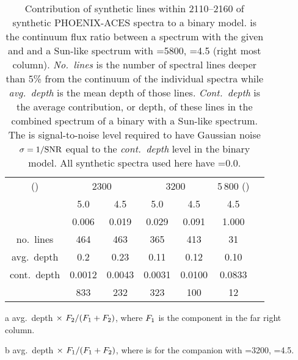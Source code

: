 
\begin{table}
    \small
    \centering
    \begin{threeparttable}[b]
        \caption[Analysis of spectral line depths.]{Contribution of synthetic lines within 2110--2160\nm{} of synthetic {PHOENIX-ACES} spectra to a binary model.
            \FtwoFone{} is the continuum flux ratio between a spectrum with the given \Teff{} and \Logg{} and a Sun-like spectrum with \Teff{}=5800, \Logg{}=4.5 (right most column).
            \emph{No.~lines} is the number of spectral lines deeper than 5\% from the continuum of the individual spectra while \emph{avg.~depth} is the mean depth of those lines.
            \emph{Cont.~depth} is the average contribution, or depth, of these lines in the combined spectrum of a binary with a Sun-like spectrum.
            The \snr{} is signal-to-noise level required to have Gaussian noise \(\sigma=1/\textrm{SNR}{}\) equal to the \emph{cont.~depth} level in the binary model.
            All synthetic spectra used here have \feh{}=0.0.}
        \begin{tabular}{*7c}
            \toprule
            \Teff{} (\K{}) & \multicolumn{2}{c}{2300} & \multicolumn{2}{c}{3200} & 5\,800 (\Fone{})\\
           \Logg{} & 5.0 & 4.5 & 5.0 & 4.5 & 4.5 \\
            \midrule
            \FtwoFone{} & 0.006 & 0.019 & 0.029 & 0.091 & 1.000 \\
            no.~lines & 464 & 463 & 365 & 413 & 31 \\
            avg.~depth & 0.2 & 0.23 & 0.11 & 0.12 & 0.10 \\
            cont.~depth\tnote{a} &  0.0012 & 0.0043 &  0.0031 & 0.0100 & 0.0833\tnote{b} \\
            \snr{} & 833 & 232 & 323 & 100 & 12 \\
            \bottomrule
        \end{tabular}\label{tab:line_contributions}
        \begin{tablenotes}
            \item [a] avg.~depth \(\times~ {F}_{2}{} / ({F}_{1}{} + {F}_{2}{})\), where \({F}_{1}{}\) is the component in the far right column.
            \item[b] avg.~depth \(\times~ {F}_{1}{} / ({F}_{1}{} + {F}_{2}{})\), where \Ftwo{} is for the companion with \Teff{}=3200, \Logg{}=4.5.
        \end{tablenotes}
    \end{threeparttable}
\end{table}
